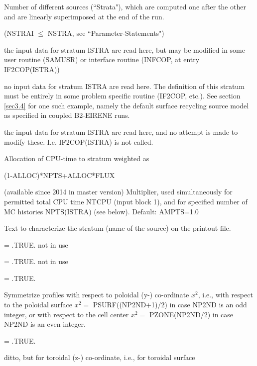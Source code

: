 \begin{list}{ }{}
\item[{\bf NSTRAI }] Number of different sources (``Strata"), which
are computed
one after the other and are linearly superimposed at the end of the run.

(NSTRAI $\le$ NSTRA, see ``Parameter-Statements") \item[{\bf
INDSRC }]
\begin{list}{ }{}
\item[{INDSRC(ISTRA)=0--5}]
the input data for stratum ISTRA are read here,
but may be modified in some user routine (SAMUSR) or interface routine (INFCOP,
at entry IF2COP(ISTRA))
\item[{INDSRC(ISTRA)=6}]
no input data for stratum ISTRA are read here. The definition of this stratum
must be entirely in some problem specific routine (IF2COP, etc.).
See section \ref{sec3.4} for one such example,
namely the default surface recycling
source model as specified in coupled B2-EIRENE runs.
\item[{INDSRC(ISTRA)=-1}]
the input data for stratum ISTRA are read here, and no attempt is made to
modify these. I.e. IF2COP(ISTRA) is not called.
\end{list}
\item[{\bf ALLOC }]  Allocation of CPU-time to stratum weighted as

(1-ALLOC)*NPTS+ALLOC*FLUX
\item[{\bf AMPTS}]  (available since 2014 in master version) Multiplier, used simultaneously
for permitted total CPU time NTCPU (input block 1), and for specified number of MC histories NPTS(ISTRA) (see below).
Default: AMPTS=1.0
\item[{\bf TXTSOU }]
Text to characterize the stratum (name of the source) on the
printout file.
\item[{\bf NLAVRP }]
= .TRUE.  not in use
\item[{\bf NLAVRT }]
= .TRUE.  not in use
\item[{\bf NLSYMP }]
= .TRUE.

Symmetrize profiles with respect to poloidal (y-) co-ordinate $x^2$,
i.e., with respect to the poloidal surface $x^2=$
PSURF((NP2ND+1)/2) in case NP2ND
is an odd integer, or with respect to the cell center
$x^2=$ PZONE(NP2ND/2) in case NP2ND is an even integer.
\item[{\bf NLSYMT }]
= .TRUE.

ditto, but for toroidal (z-) co-ordinate,
i.e., for toroidal surface


\end{list}
